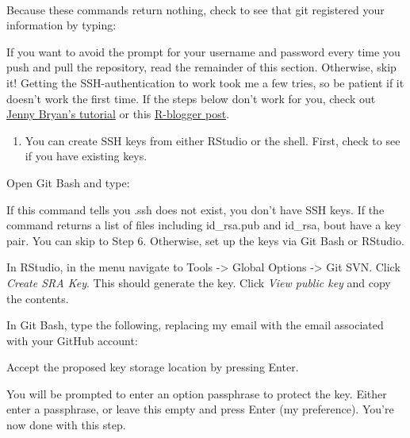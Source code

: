 \documentclass[12pt,]{article}
\providecommand{\tightlist}{%
  \setlength{\itemsep}{0pt}\setlength{\parskip}{0pt}}
\begin{document}
\colorbox{light-gray}{}\\
\colorbox{light-gray}{}

Because these commands return nothing, check to see that git registered
your information by typing:

\colorbox{light-gray}{}

If you want to avoid the prompt for your username and password every
time you push and pull the repository, read the remainder of this
section. Otherwise, skip it! Getting the SSH-authentication to work took
me a few tries, so be patient if it doesn't work the first time. If the
steps below don't work for you, check out
\href{http://happygitwithr.com/}{Jenny Bryan's tutorial} or this
\href{http://www.r-bloggers.com/rstudio-pushing-to-github-with-ssh-authentication/}{R-blogger
post}.

\begin{enumerate}
\def\labelenumi{\arabic{enumi}.}
\setcounter{enumi}{2}
\tightlist
\item
  You can create SSH keys from either RStudio or the shell. First, check
  to see if you have existing keys.
\end{enumerate}

Open Git Bash and type:

\colorbox{light-gray}{}

If this command tells you .ssh does not exist, you don't have SSH keys.
If the command returns a list of files including id\_rsa.pub and
id\_rsa, bout have a key pair. You can skip to Step 6. Otherwise, set up
the keys via Git Bash or RStudio.

In RStudio, in the menu navigate to Tools -\textgreater{} Global Options
-\textgreater{} Git SVN. Click \emph{Create SRA Key}. This should
generate the key. Click \emph{View public key} and copy the contents.

In Git Bash, type the following, replacing my email with the email
associated with your GitHub account:

\colorbox{light-gray}{}

Accept the proposed key storage location by pressing Enter.

You will be prompted to enter an option passphrase to protect the key.
Either enter a passphrase, or leave this empty and press Enter (my
preference). You're now done with this step.
\end{document}
